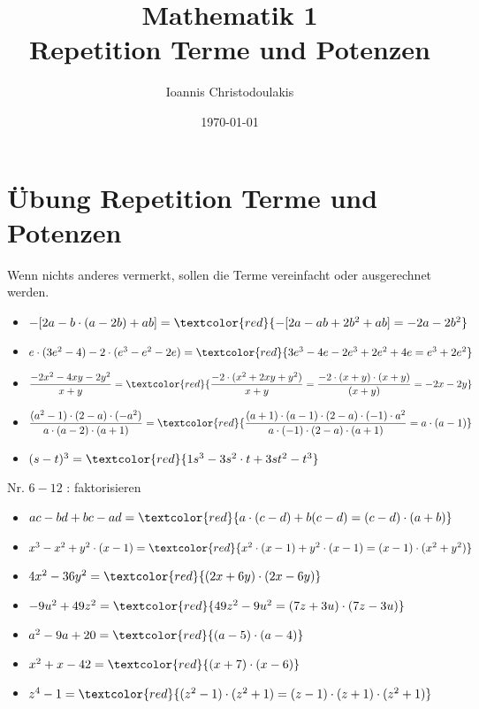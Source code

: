\documentclass[11pt, a4paper, twoside, fleqn]{article}
\title{\Huge Mathematik 1\\
\large Repetition Terme und Potenzen}
\author{Ioannis Christodoulakis}
\date{\today}
\begin{document}
\maketitle
\newpage
\tableofcontents
\newpage
\section{Übung  Repetition Terme und Potenzen}
Wenn nichts anderes vermerkt, sollen die Terme vereinfacht oder ausgerechnet werden.
\begin{itemize}[itemsep=3ex , leftmargin=*]
\item $ -[2a - b \cdot (a - 2b) +ab] = \textcolor{red}{-[2a - ab + 2b^{2} +ab] = -2a - 2b^{2}} $ 
\item $ e \cdot (3e^{2} - 4) -2 \cdot (e^{3} - e^{2} - 2e) = \textcolor{red}{3e^{3} - 4e - 2e^{3} + 2e^{2} + 4e = e^{3} + 2e^{2}} $
\item $ \dfrac{-2x^{2} - 4xy - 2y^{2}}{x+y} = \textcolor{red}{\dfrac{-2 \cdot (x^{2} + 2xy + y^{2})}{x+y} = \dfrac{-2 \cdot(x + y) \cdot (x + y)}{(x + y)} = -2x - 2y} $
\item $ \dfrac{(a^{2} - 1) \cdot (2 - a) \cdot (-a^{2})}{a \cdot (a - 2) \cdot (a + 1)} = \textcolor{red}{\dfrac{(a + 1) \cdot (a - 1) \cdot (2 - a) \cdot (-1) \cdot a^{2}}{a \cdot (-1) \cdot (2 - a) \cdot (a + 1)} = a \cdot (a - 1)}  $
\item $ (s - t)^{3} = \textcolor{red}{1s^{3} - 3s^{2} \cdot t + 3st^{2} - t^{3}} $ \\
\end{itemize}
Nr. $ 6-12 $ : faktorisieren
\begin{itemize}[itemsep=3ex , leftmargin=*]
\item $ ac - bd +bc - ad = \textcolor{red}{a \cdot (c - d) +b (c-d) = (c - d) \cdot (a + b)} $
\item $ x^{3} - x^{2} + y^{2} \cdot (x - 1) = \textcolor{red}{x^{2} \cdot (x - 1) + y^{2} \cdot (x - 1) = (x - 1) \cdot (x^{2} + y^{2})} $
\item $ 4x^{2} - 36y^{2} = \textcolor{red}{(2x + 6y) \cdot (2x - 6y)} $
\item $ -9u^{2} + 49z^{2} = \textcolor{red}{49z^{2} - 9u^{2} = (7z + 3u) \cdot (7z - 3u) } $
\item $ a^{2} - 9a + 20 = \textcolor{red}{(a- 5) \cdot (a - 4)} $
\item $ x^{2} + x - 42 = \textcolor{red}{(x + 7) \cdot (x - 6)} $
\item $ z^{4} - 1 = \textcolor{red}{(z^{2}-1)\cdot(z^{2}+1) = (z-1) \cdot (z+1) \cdot(z^{2}+1) } $
\end{itemize}
\end{document}

